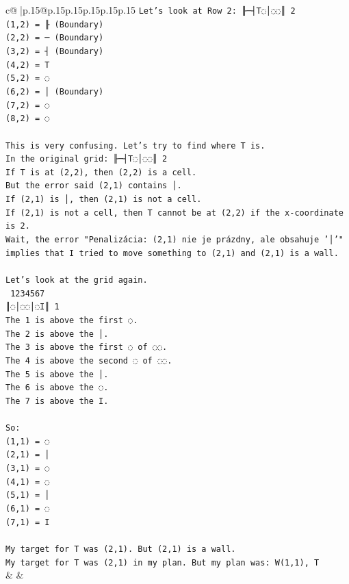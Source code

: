 \documentclass{article}
\begin{document}
{\begin{supertabular}{c@{$\;$}|p{.15\linewidth}@{}p{.15\linewidth}p{.15\linewidth}p{.15\linewidth}p{.15\linewidth}p{.15\linewidth}}
{{{\texttt{Let's look at Row 2: ╟─┤T◌│◌◌║ 2} \\
\texttt{(1,2) = ╟ (Boundary)} \\
\texttt{(2,2) = ─ (Boundary)} \\
\texttt{(3,2) = ┤ (Boundary)} \\
\texttt{(4,2) = T} \\
\texttt{(5,2) = ◌} \\
\texttt{(6,2) = │ (Boundary)} \\
\texttt{(7,2) = ◌} \\
\texttt{(8,2) = ◌} \\
\\ 
\texttt{This is very confusing. Let's try to find where T is.} \\
\texttt{In the original grid: ╟─┤T◌│◌◌║ 2} \\
\texttt{If T is at (2,2), then (2,2) is a cell.} \\
\texttt{But the error said (2,1) contains │.} \\
\texttt{If (2,1) is │, then (2,1) is not a cell.} \\
\texttt{If (2,1) is not a cell, then T cannot be at (2,2) if the x{-}coordinate is 2.} \\
\texttt{Wait, the error "Penalizácia: (2,1) nie je prázdny, ale obsahuje '│'" implies that I tried to move something to (2,1) and (2,1) is a wall.} \\
\\ 
\texttt{Let's look at the grid again.} \\
\texttt{ 1234567} \\
\texttt{║◌│◌◌│◌I║ 1} \\
\texttt{The 1 is above the first ◌.} \\
\texttt{The 2 is above the │.} \\
\texttt{The 3 is above the first ◌ of ◌◌.} \\
\texttt{The 4 is above the second ◌ of ◌◌.} \\
\texttt{The 5 is above the │.} \\
\texttt{The 6 is above the ◌.} \\
\texttt{The 7 is above the I.} \\
\\ 
\texttt{So:} \\
\texttt{(1,1) = ◌} \\
\texttt{(2,1) = │} \\
\texttt{(3,1) = ◌} \\
\texttt{(4,1) = ◌} \\
\texttt{(5,1) = │} \\
\texttt{(6,1) = ◌} \\
\texttt{(7,1) = I} \\
\\ 
\texttt{My target for T was (2,1). But (2,1) is a wall.} \\
\texttt{My target for T was (2,1) in my plan. But my plan was: W(1,1), T} \\
            }
        }
    }
    & & \\ \\


\end{supertabular}}
\end{document}
